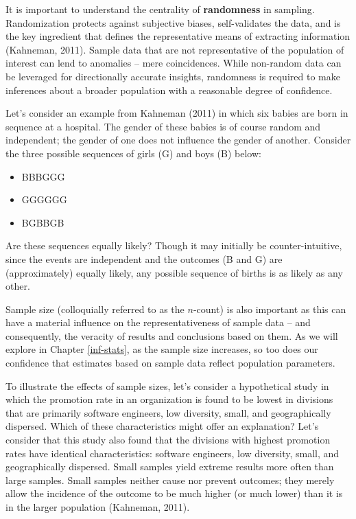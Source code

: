 \documentclass[]{book}
\providecommand{\tightlist}{%
  \setlength{\itemsep}{0pt}\setlength{\parskip}{0pt}}
\begin{document}
It is important to understand the centrality of \textbf{randomness} in sampling. Randomization protects against subjective biases, self-validates the data, and is the key ingredient that defines the representative means of extracting information (Kahneman, 2011). Sample data that are not representative of the population of interest can lend to anomalies -- mere coincidences. While non-random data can be leveraged for directionally accurate insights, randomness is required to make inferences about a broader population with a reasonable degree of confidence.

Let's consider an example from Kahneman (2011) in which six babies are born in sequence at a hospital. The gender of these babies is of course random and independent; the gender of one does not influence the gender of another. Consider the three possible sequences of girls (G) and boys (B) below:

\begin{itemize}
\tightlist
\item
  BBBGGG
\item
  GGGGGG
\item
  BGBBGB
\end{itemize}

Are these sequences equally likely? Though it may initially be counter-intuitive, since the events are independent and the outcomes (B and G) are (approximately) equally likely, any possible sequence of births is as likely as any other.

Sample size (colloquially referred to as the \(n\)-count) is also important as this can have a material influence on the representativeness of sample data -- and consequently, the veracity of results and conclusions based on them. As we will explore in Chapter \ref{inf-stats}, as the sample size increases, so too does our confidence that estimates based on sample data reflect population parameters.

To illustrate the effects of sample sizes, let's consider a hypothetical study in which the promotion rate in an organization is found to be lowest in divisions that are primarily software engineers, low diversity, small, and geographically dispersed. Which of these characteristics might offer an explanation? Let's consider that this study also found that the divisions with highest promotion rates have identical characteristics: software engineers, low diversity, small, and geographically dispersed.
Small samples yield extreme results more often than large samples. Small samples neither cause nor prevent outcomes; they merely allow the incidence of the outcome to be much higher (or much lower) than it is in the larger population (Kahneman, 2011).
\end{document}
